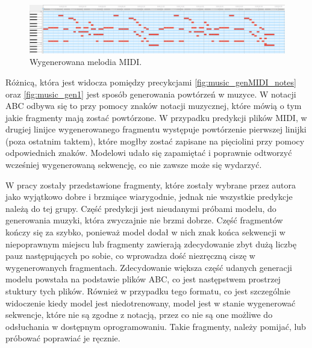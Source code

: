 \documentclass[data-science]{agh-wi} %
\begin{document}
\begin{figure}[ht!]
    \begin{center}
        \includegraphics[width=0.9\linewidth]{./img/midi_generated.png}
    \end{center}
    \caption{Wygenerowana melodia MIDI.}\label{fig:music_genMIDI}
\end{figure}

Różnicą, która jest widocza pomiędzy precykcjami \ref*{fig:music_genMIDI_notes} oraz \ref*{fig:music_gen1} jest sposób generowania powtórzeń w muzyce. W notacji ABC odbywa się to przy pomocy znaków notacji muzycznej, które mówią o tym jakie fragmenty mają zostać powtórzone. W przypadku predykcji plików MIDI, w drugiej linijce wygenerowanego fragmentu występuje powtórzenie pierwszej linijki (poza ostatnim taktem), które mogłby zostać zapisane na pięciolini przy pomocy odpowiednich znaków. Modelowi udało się zapamiętać i poprawnie odtworzyć wcześniej wygenerowaną sekwencję, co nie zawsze może się wydarzyć.

W pracy zostały przedstawione fragmenty, które zostały wybrane przez autora jako wyjątkowo dobre i brzmiące wiarygodnie, jednak nie wszystkie predykcje należą do tej grupy. Część predykcji jest nieudanymi próbami modelu, do generowania muzyki, która zwyczajnie nie brzmi dobrze. Część fragmentów kończy się za szybko, ponieważ model dodał w nich znak końca sekwencji w niepoprawnym miejscu lub fragmenty zawierają zdecydowanie zbyt dużą liczbę pauz następujących po sobie, co wprowadza dość niezręczną ciszę w wygenerowanych fragmentach. Zdecydowanie większa część udanych generacji modelu powstała na podstawie plików ABC, co jest następstwem prostrzej stuktury tych plików. Również w przypadku tego formatu, co jest szczególnie widoczenie kiedy model jest niedotrenowany, model jest w stanie wygenerować sekwencje, które nie są zgodne z notacją, przez co nie są one możliwe do odsłuchania w dostępnym oprogramowaniu. Takie fragmenty, należy pomijać, lub próbować poprawiać je ręcznie.
\end{document}
